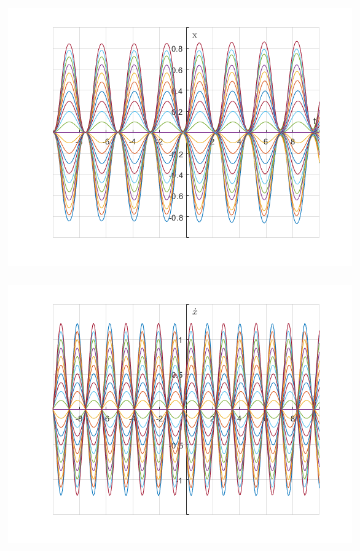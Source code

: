 \documentclass{article}
\begin{document}
	\begin{figure}[h!]
		\graphicspath{{./SmallOscillations/S1} }
		\centering
		\begin{subfigure}[b]{0.48\linewidth}
			\includegraphics[width=\linewidth]{./SmallOscillations/S2/F3.png}
		\end{subfigure}
		\begin{subfigure}[b]{0.48\linewidth}
			\includegraphics[width=\linewidth]{./SmallOscillations/S2/F4.png}
		\end{subfigure}
	\end{figure}
\end{document}
